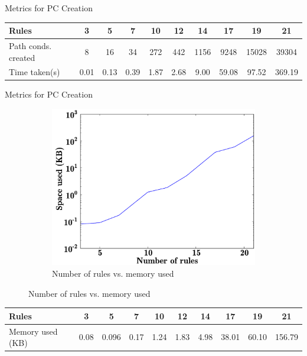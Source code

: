 \documentclass[xcolor=dvipsnames, 14pt]{beamer}
\begin{document}
\begin{frame}{Metrics for PC Creation}
\begin{figure}[htb]
\end{figure}
\footnotesize
\begin{tabular}{|p{1.3cm}|c|c|c|c|c|c|c|c|c|}
\hline
Rules & 3&  5&  7&  10&  12&  14 & 17 & 19 & 21\\\hline
Path conds. created & 8&  16&  34&  272&  442&  1156 & 9248 & 15028 & 39304\\\hline
Time taken(s) & 0.01&  0.13&  0.39&  1.87&  2.68&  9.00 & 59.08 & 97.52 & 369.19\\
\hline
\end{tabular}
\normalsize
\end{frame}

\begin{frame}{Metrics for PC Creation}
\begin{figure}[htb]
        \centering
        \begin{subfigure}[b]{0.5\textwidth}
                \centering
                \includegraphics[width=1\textwidth]{../figures/results/rules_vs_memory.pdf}
                \caption{Number of rules vs. memory used}
                \label{fig:rules_vs_pcs}
        \end{subfigure}%
        

\end{figure}
\footnotesize
\begin{tabular}{|p{1.6cm}|c|c|c|c|c|c|c|c|c|}
\hline
Rules & 3&  5&  7&  10&  12&  14 & 17 & 19 & 21\\\hline
Memory used (KB) & 0.08&  0.096&  0.17&  1.24&  1.83& 4.98 & 38.01 & 60.10 & 156.79\\
\hline
\end{tabular}
\normalsize
\end{frame}
\end{document}
